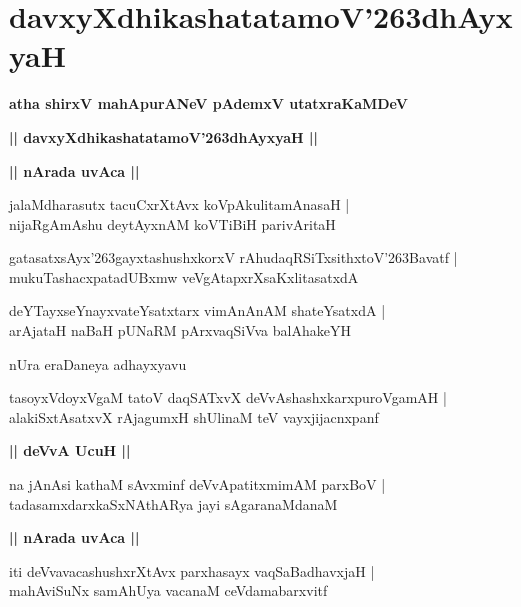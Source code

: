 \documentclass[twoside,12pt,openright]{book}
\def\S{\char'263}
\newcounter{shloka}[chapter]
\def\uvaca#1{\centerline{{\large\textbf{#1}}}}
\begin{document}
\chapter{davxyXdhikashatatamoV\S dhAyxyaH}

\begin{center}
{\LARGE\bfseries atha shirxV mahApurANeV pAdemxV utatxraKaMDeV}
\end{center}

\begin{center}
{\LARGE\bfseries || davxyXdhikashatatamoV\S dhAyxyaH || }
\end{center}

\uvaca{|| nArada uvAca ||}

\begin{shloka}%
jalaMdharasutx tacuCxrXtAvx koVpAkulitamAnasaH |\\
nijaRgAmAshu deytAyxnAM koVTiBiH parivAritaH 
\end{shloka}

\begin{shloka}%
gatasatxsAyx\S gayxtashushxkorxV rAhudaqRSiTxsithxtoV\S Bavatf |\\
mukuTashacxpatadUBxmw veVgAtapxrXsaKxlitasatxdA
\end{shloka}

\begin{shloka}%
deYTayxseYnayxvateYsatxtarx vimAnAnAM shateYsatxdA |\\
arAjataH naBaH pUNaRM pArxvaqSiVva balAhakeYH 
\end{shloka}

\begin{center}
nUra eraDaneya adhayxyavu
\end{center}

\begin{shloka}%
tasoyxVdoyxVgaM tatoV daqSATxvX deVvAshashxkarxpuroVgamAH |\\
alakiSxtAsatxvX rAjagumxH shUlinaM teV vayxjijacnxpanf
\end{shloka}

\uvaca{|| deVvA UcuH ||}

\begin{shloka}%
na jAnAsi kathaM sAvxminf deVvApatitxmimAM parxBoV |\\
tadasamxdarxkaSxNAthARya jayi sAgaranaMdanaM 
\end{shloka}

\uvaca{|| nArada uvAca ||}

\begin{shloka}%
iti deVvavacashushxrXtAvx parxhasayx vaqSaBadhavxjaH |\\
mahAviSuNx samAhUya vacanaM ceVdamabarxvitf
\end{shloka}
\end{document}
